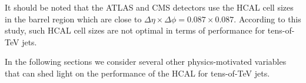 It should be noted that the ATLAS and CMS detectors use the HCAL cell sizes in the barrel region which are close to 
$\Delta \eta \times \Delta \phi = 0.087\times 0.087$.  According to this study,
such HCAL cell sizes are not optimal in terms of performance  for tens-of-TeV jets.

In the following sections we consider several other physics-motivated
variables that can shed light on the performance of the HCAL for tens-of-TeV jets.

\begin{figure}
\begin{center}
\end{center}
\end{figure}
